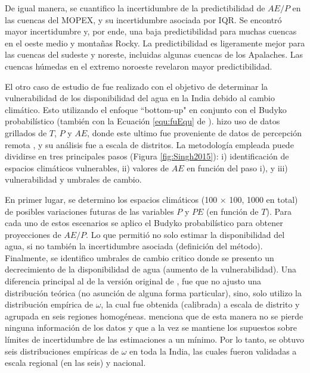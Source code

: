 \documentclass[12pt]{article}
\begin{document}
De igual manera, se cuantifico la incertidumbre de la predictibilidad de $AE/P$ en las cuencas del MOPEX, y su incertidumbre asociada por IQR. Se encontró mayor incertidumbre y, por ende, una baja predictibilidad para muchas cuencas en el oeste medio y montañas Rocky. La predictibilidad es ligeramente mejor para las cuencas del sudeste y noreste, incluidas algunas cuencas de los Apalaches. Las cuencas húmedas en el extremo noroeste revelaron mayor predictibilidad.

El otro caso de estudio de \citet{Singh2015} fue realizado con el objetivo de determinar la vulnerabilidad de los disponibilidad del agua en la India debido al cambio climático. Esto utilizando el enfoque “bottom-up" en conjunto con el Budyko probabilístico (también con la Ecuación \ref{equ:fuEqu} de \citet{Fu1981}). \citet{Singh2015} hizo uso de datos grillados de $T$, $P$ y $AE$, donde este ultimo fue proveniente de datos de percepción remota \citet{zhang2016review}, y su análisis fue a escala de distritos. La metodología empleada puede dividirse en tres principales pasos (Figura \ref{fig:Singh2015}): i) identificación de espacios climáticos vulnerables, ii) valores de $AE$ en función del paso i), y iii) vulnerabilidad y umbrales de cambio. 



En primer lugar, se determino los espacios climáticos (100 $\times$ 100, 1000 en total) de posibles variaciones futuras de las variables $P$ y $PE$ (en función de $T$). Para cada uno de estos escenarios se aplico el Budyko probabilístico para obtener proyecciones de $AE/P$. Lo que permitió no solo estimar la disponibilidad del agua, si no también la incertidumbre asociada (definición del método). Finalmente, se identifico umbrales de cambio critico donde se presento un decrecimiento de la disponibilidad de agua (aumento de la vulnerabilidad). Una diferencia principal al de la versión original de \citet{Greve2015}, fue que \citet{Singh2015} no ajusto una distribución teórica (no asunción de alguna forma particular), sino, solo utilizo la distribución empírica de $\omega$, la cual fue obtenida (calibrada) a escala de distrito y agrupada en seis regiones homogéneas. \citet{Singh2015} menciona que de esta manera no se pierde ninguna información de los datos y que a la vez se mantiene los supuestos sobre límites de incertidumbre de las estimaciones a un mínimo. Por lo tanto, se obtuvo seis distribuciones empíricas de $\omega$ en toda la India, las cuales fueron validadas a escala regional (en las seis) y nacional.
\end{document}
